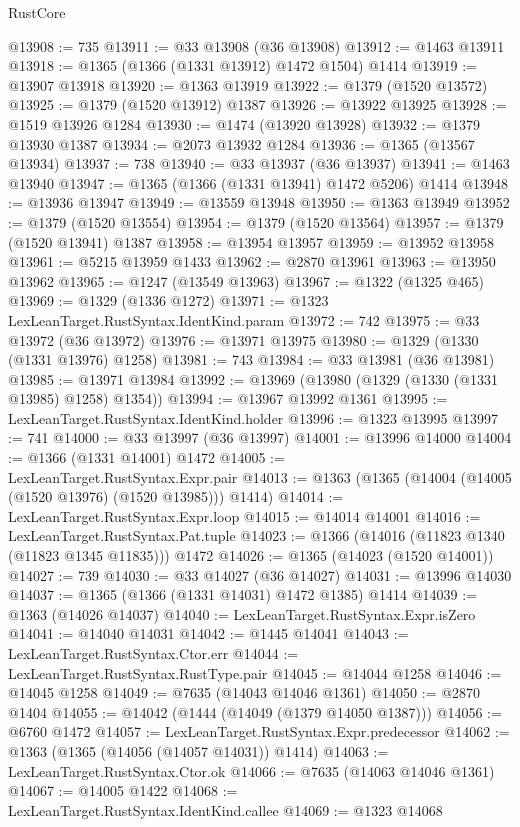 \begin{lexlean}{RustCore}
\begin{coremodule}
@13908 := 735
@13911 := @33 @13908 (@36 @13908)
@13912 := @1463 @13911
@13918 := @1365 (@1366 (@1331 @13912) @1472 @1504) @1414
@13919 := @13907 @13918
@13920 := @1363 @13919
@13922 := @1379 (@1520 @13572)
@13925 := @1379 (@1520 @13912) @1387
@13926 := @13922 @13925
@13928 := @1519 @13926 @1284
@13930 := @1474 (@13920 @13928)
@13932 := @1379 @13930 @1387
@13934 := @2073 @13932 @1284
@13936 := @1365 (@13567 @13934)
@13937 := 738
@13940 := @33 @13937 (@36 @13937)
@13941 := @1463 @13940
@13947 := @1365 (@1366 (@1331 @13941) @1472 @5206) @1414
@13948 := @13936 @13947
@13949 := @13559 @13948
@13950 := @1363 @13949
@13952 := @1379 (@1520 @13554)
@13954 := @1379 (@1520 @13564)
@13957 := @1379 (@1520 @13941) @1387
@13958 := @13954 @13957
@13959 := @13952 @13958
@13961 := @5215 @13959 @1433
@13962 := @2870 @13961
@13963 := @13950 @13962
@13965 := @1247 (@13549 @13963)
@13967 := @1322 (@1325 @465)
@13969 := @1329 (@1336 @1272)
@13971 := @1323 LexLeanTarget.RustSyntax.IdentKind.param
@13972 := 742
@13975 := @33 @13972 (@36 @13972)
@13976 := @13971 @13975
@13980 := @1329 (@1330 (@1331 @13976) @1258)
@13981 := 743
@13984 := @33 @13981 (@36 @13981)
@13985 := @13971 @13984
@13992 := @13969 (@13980 (@1329 (@1330 (@1331 @13985) @1258) @1354))
@13994 := @13967 @13992 @1361
@13995 := LexLeanTarget.RustSyntax.IdentKind.holder
@13996 := @1323 @13995
@13997 := 741
@14000 := @33 @13997 (@36 @13997)
@14001 := @13996 @14000
@14004 := @1366 (@1331 @14001) @1472
@14005 := LexLeanTarget.RustSyntax.Expr.pair
@14013 := @1363 (@1365 (@14004 (@14005 (@1520 @13976) (@1520 @13985))) @1414)
@14014 := LexLeanTarget.RustSyntax.Expr.loop
@14015 := @14014 @14001
@14016 := LexLeanTarget.RustSyntax.Pat.tuple
@14023 := @1366 (@14016 (@11823 @1340 (@11823 @1345 @11835))) @1472
@14026 := @1365 (@14023 (@1520 @14001))
@14027 := 739
@14030 := @33 @14027 (@36 @14027)
@14031 := @13996 @14030
@14037 := @1365 (@1366 (@1331 @14031) @1472 @1385) @1414
@14039 := @1363 (@14026 @14037)
@14040 := LexLeanTarget.RustSyntax.Expr.isZero
@14041 := @14040 @14031
@14042 := @1445 @14041
@14043 := LexLeanTarget.RustSyntax.Ctor.err
@14044 := LexLeanTarget.RustSyntax.RustType.pair
@14045 := @14044 @1258
@14046 := @14045 @1258
@14049 := @7635 (@14043 @14046 @1361)
@14050 := @2870 @1404
@14055 := @14042 (@1444 (@14049 (@1379 @14050 @1387)))
@14056 := @6760 @1472
@14057 := LexLeanTarget.RustSyntax.Expr.predecessor
@14062 := @1363 (@1365 (@14056 (@14057 @14031)) @1414)
@14063 := LexLeanTarget.RustSyntax.Ctor.ok
@14066 := @7635 (@14063 @14046 @1361)
@14067 := @14005 @1422
@14068 := LexLeanTarget.RustSyntax.IdentKind.callee
@14069 := @1323 @14068

\end{coremodule}
\end{lexlean}

